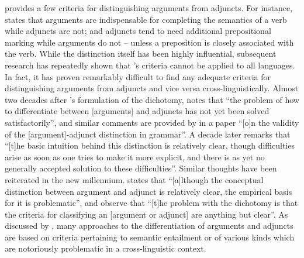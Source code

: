 \citet{tesniere:1959} provides a few criteria for distinguishing arguments from adjuncts. For instance, \citet[128]{tesniere:1959} states that arguments are indispensable for completing the semantics of a verb while adjuncts are not; and adjuncts tend to need additional prepositional marking while arguments do not – unless a preposition is closely associated with the verb. While the distinction itself has been highly influential, subsequent research has repeatedly shown that \citeauthor{tesniere:1959}’s criteria cannot be applied to all languages. In fact, it has proven remarkably difficult to find any adequate criteria for distinguishing arguments from adjuncts and vice versa cross-linguistically. Almost two decades after \citeauthor{tesniere:1959}’s formulation of the dichotomy, \citet[21]{vater:1978} notes that “the problem of how to differentiate between [arguments] and adjuncts has not yet been solved satisfactorily”, and similar comments are provided by \citet{somers:1984} in a paper “[o]n the validity of the [argument]-adjunct distinction in  grammar”. A decade later \citet[906]{comrie:1993} remarks that “[t]he basic intuition behind this distinction is relatively clear, though difficulties arise as soon as one tries to make it more explicit, and there is as yet no generally accepted solution to these difficulties”. Similar thoughts have been reiterated in the new millennium. \citet[30]{farrell:2005} states that “[a]lthough the conceptual distinction between argument and adjunct is relatively clear, the empirical basis for it is problematic”, and \citet[165]{rickheit:sichelschmidt:2007} observe that “[t]he problem with the dichotomy is that the criteria for classifying an [argument or adjunct] are anything but clear”. As discussed by \citet[46ff.]{haspelmath:hartmann:2015}, many approaches to the differentiation of arguments and adjuncts are based on criteria pertaining to semantic entailment or  of various kinds which are notoriously problematic in a cross-linguistic context.

